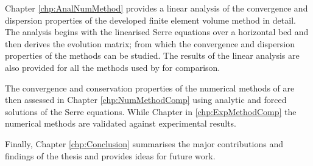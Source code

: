 Chapter \ref{chp:AnalNumMethod} provides a linear analysis of the convergence and dispersion properties of the developed finite element volume method in detail. The analysis begins with the linearised Serre equations over a horizontal bed and then derives the evolution matrix; from which the convergence and dispersion properties of the methods can be studied. The results of the linear analysis are also provided for all the methods used by \citet{Pitt-2018-61} for comparison.

The convergence and conservation properties of the numerical methods of \citet{Pitt-2018-61} are then assessed in Chapter \ref{chp:NumMethodComp} using analytic and forced solutions of the Serre equations. While Chapter in \ref{chp:ExpMethodComp} the numerical methods are validated against experimental results.

Finally, Chapter \ref{chp:Conclusion} summarises the major contributions and findings of the thesis and provides ideas for future work. 